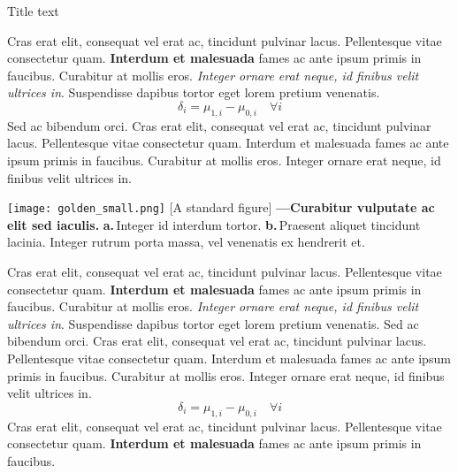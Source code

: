 \documentclass[./main.tex]{subfiles}
\begin{document}
\begin{simplebox}[
    label={mynamelabel1},
    nameref={Title or anything else}
    ]{Title text}
    \begin{minipage}[t]{\linewidth}
    Cras erat elit, consequat vel erat ac, tincidunt pulvinar lacus. Pellentesque vitae consectetur quam. \textbf{Interdum et malesuada} fames ac ante ipsum primis in faucibus. Curabitur at mollis eros. \textit{Integer ornare erat neque, id finibus velit ultrices in}. Suspendisse dapibus tortor eget lorem pretium venenatis.
    \begin{equation*} %
    		\label{eq:myeq3}
    		\delta_{i} = \mu_{1, i} - \mu_{0, i} \quad \forall i 
    \end{equation*}
    Sed ac bibendum orci. Cras erat elit, consequat vel erat ac, tincidunt pulvinar lacus. Pellentesque vitae consectetur quam. Interdum et malesuada fames ac ante ipsum primis in faucibus. Curabitur at mollis eros. Integer ornare erat neque, id finibus velit ultrices in.
    \end{minipage}
    \begin{minipage}[t]{\linewidth}
        \begin{minipage}[t]{0.6\linewidth}
        \vspace*{5pt}
        	\texttt{[image: golden\_small.png]}		
        	[A standard figure]{
            	\textbf{---\;Curabitur vulputate ac elit sed iaculis.}
            	\textbf{a.}\,Integer id interdum tortor.
            	\textbf{b.}\,Praesent aliquet tincidunt lacinia. Integer rutrum porta massa, vel venenatis ex hendrerit et. 
        	}
            \label{fig:myfig4}  %
        \vspace*{5pt}
    \end{minipage}
    \end{minipage}
    \begin{minipage}[t]{\linewidth}
    Cras erat elit, consequat vel erat ac, tincidunt pulvinar lacus. Pellentesque vitae consectetur quam. \textbf{Interdum et malesuada} fames ac ante ipsum primis in faucibus. Curabitur at mollis eros. \textit{Integer ornare erat neque, id finibus velit ultrices in}. Suspendisse dapibus tortor eget lorem pretium venenatis.
    Sed ac bibendum orci. Cras erat elit, consequat vel erat ac, tincidunt pulvinar lacus. Pellentesque vitae consectetur quam. Interdum et malesuada fames ac ante ipsum primis in faucibus. Curabitur at mollis eros. Integer ornare erat neque, id finibus velit ultrices in. 
    \begin{equation*} %
    		\label{eq:myeq3453453}
    		\delta_{i} = \mu_{1, i} - \mu_{0, i} \quad \forall i 
    \end{equation*}
    Cras erat elit, consequat vel erat ac, tincidunt pulvinar lacus. Pellentesque vitae consectetur quam. \textbf{Interdum et malesuada} fames ac ante ipsum primis in faucibus. 
    \end{minipage}
\label{box:01}
\end{simplebox}
\end{document}
